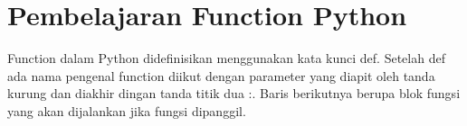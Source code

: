 \section{Pembelajaran Function Python}
Function dalam Python didefinisikan menggunakan kata kunci def. Setelah def ada nama pengenal function diikut dengan parameter yang diapit oleh tanda kurung dan diakhir dingan tanda titik dua :. Baris berikutnya berupa blok fungsi yang akan dijalankan jika fungsi dipanggil. 
